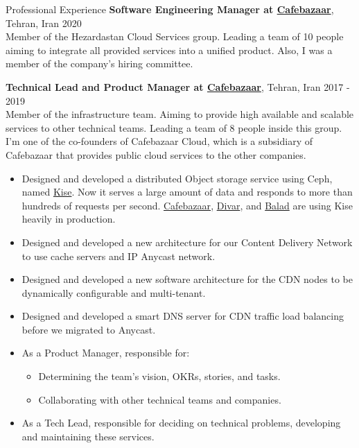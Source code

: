 \documentclass{resume} %
\begin{document}
\begin{rSection}{Professional Experience}
	{\bf Software Engineering Manager at \href{https://cafebazaar.ir/}{Cafebazaar}}, Tehran, Iran \hfill 2020
	\\ Member of the Hezardastan Cloud Services group. Leading a team of 10 people aiming to integrate all provided services into a unified product. Also, I was a member of the company's hiring committee.
	
	{\bf Technical Lead and Product Manager at \href{https://cafebazaar.ir/}{Cafebazaar}}, Tehran, Iran \hfill 2017 - 2019
	\\ Member of the infrastructure team. Aiming to provide high available and scalable services to other technical teams. Leading a team of 8 people inside this group. I'm one of the co-founders of Cafebazaar Cloud, which is a subsidiary of Cafebazaar that provides public cloud services to the other companies.
	\begin{itemize}
		\item Designed and developed a distributed Object storage service using Ceph, named \href{https://kise.roo.cloud/}{Kise}. Now it serves a large amount of data and responds to more than hundreds of requests per second. \href{https://cafebazaar.ir/}{Cafebazaar}, \href{https://divar.ir/}{Divar}, and \href{http://balad.ir/}{Balad} are using Kise heavily in production.
		\item Designed and developed a new architecture for our Content Delivery Network to use cache servers and IP Anycast network.
		\item Designed and developed a new software architecture for the CDN nodes to be dynamically configurable and multi-tenant.
		\item Designed and developed a smart DNS server for CDN traffic load balancing before we migrated to Anycast.
		\item As a Product Manager, responsible for:
		\begin{itemize}
			\item Determining the team's vision, OKRs, stories, and tasks.
			\item Collaborating with other technical teams and companies.
		\end{itemize}
		\item As a Tech Lead, responsible for deciding on technical problems, developing and maintaining these services.
	\end{itemize}
	

\end{rSection}
\end{document}
